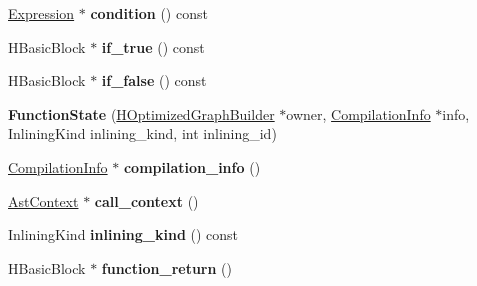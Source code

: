 \begin{DoxyCompactItemize}
\item 
\hypertarget{classv8_1_1internal_1_1_v8___f_i_n_a_l_ad5acc76384238dc0da9f122856750f83}{}\hyperlink{classv8_1_1internal_1_1_expression}{Expression} $\ast$ {\bfseries condition} () const \label{classv8_1_1internal_1_1_v8___f_i_n_a_l_ad5acc76384238dc0da9f122856750f83}

\item 
\hypertarget{classv8_1_1internal_1_1_v8___f_i_n_a_l_acd1c40e2b185f9e7df295c614070d285}{}H\+Basic\+Block $\ast$ {\bfseries if\+\_\+true} () const \label{classv8_1_1internal_1_1_v8___f_i_n_a_l_acd1c40e2b185f9e7df295c614070d285}

\item 
\hypertarget{classv8_1_1internal_1_1_v8___f_i_n_a_l_ab2dee76bd14ac4e173c7be78ffb80863}{}H\+Basic\+Block $\ast$ {\bfseries if\+\_\+false} () const \label{classv8_1_1internal_1_1_v8___f_i_n_a_l_ab2dee76bd14ac4e173c7be78ffb80863}

\item 
\hypertarget{classv8_1_1internal_1_1_v8___f_i_n_a_l_a37e4b32ab9bc127596c3ea7aab639072}{}{\bfseries Function\+State} (\hyperlink{classv8_1_1internal_1_1_h_optimized_graph_builder}{H\+Optimized\+Graph\+Builder} $\ast$owner, \hyperlink{classv8_1_1internal_1_1_compilation_info}{Compilation\+Info} $\ast$info, Inlining\+Kind inlining\+\_\+kind, int inlining\+\_\+id)\label{classv8_1_1internal_1_1_v8___f_i_n_a_l_a37e4b32ab9bc127596c3ea7aab639072}

\item 
\hypertarget{classv8_1_1internal_1_1_v8___f_i_n_a_l_af745112c73200cd5faf737326dff5813}{}\hyperlink{classv8_1_1internal_1_1_compilation_info}{Compilation\+Info} $\ast$ {\bfseries compilation\+\_\+info} ()\label{classv8_1_1internal_1_1_v8___f_i_n_a_l_af745112c73200cd5faf737326dff5813}

\item 
\hypertarget{classv8_1_1internal_1_1_v8___f_i_n_a_l_a05a1cb6674b9268746cfea55b4932898}{}\hyperlink{classv8_1_1internal_1_1_ast_context}{Ast\+Context} $\ast$ {\bfseries call\+\_\+context} ()\label{classv8_1_1internal_1_1_v8___f_i_n_a_l_a05a1cb6674b9268746cfea55b4932898}

\item 
\hypertarget{classv8_1_1internal_1_1_v8___f_i_n_a_l_a6fdfb7a4f568097a2ca6c16776bd71bf}{}Inlining\+Kind {\bfseries inlining\+\_\+kind} () const \label{classv8_1_1internal_1_1_v8___f_i_n_a_l_a6fdfb7a4f568097a2ca6c16776bd71bf}

\item 
\hypertarget{classv8_1_1internal_1_1_v8___f_i_n_a_l_a2250f5bc42191b051db3cefae908fa20}{}H\+Basic\+Block $\ast$ {\bfseries function\+\_\+return} ()\label{classv8_1_1internal_1_1_v8___f_i_n_a_l_a2250f5bc42191b051db3cefae908fa20}


\end{DoxyCompactItemize}
